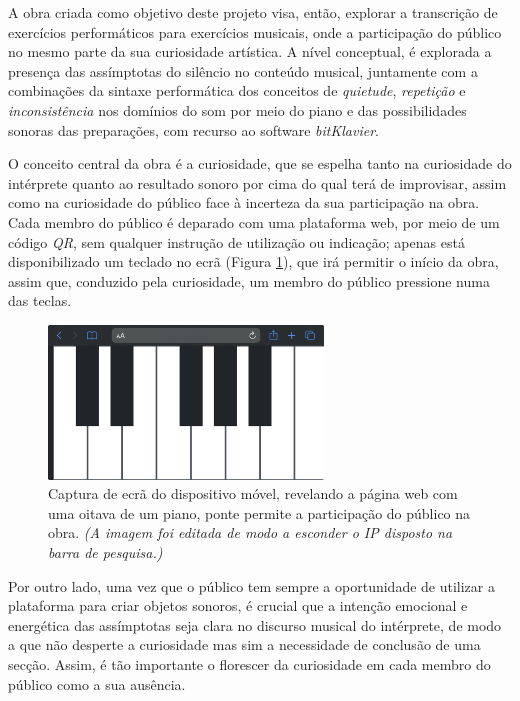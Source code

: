 \documentclass[../main.tex]{subfiles}
\begin{document}
A obra criada como objetivo deste projeto visa, então, explorar a transcrição de exercícios performáticos para exercícios musicais, onde a participação do público no mesmo parte da sua curiosidade artística. A nível conceptual, é explorada a presença das assímptotas do silêncio no conteúdo musical, juntamente com a combinações da sintaxe performática dos conceitos de \textsl{quietude}, \textsl{repetição} e \textsl{inconsistência} nos domínios do som por meio do piano e das possibilidades sonoras das preparações, com recurso ao software \textsl{bitKlavier}.

O conceito central da obra é a curiosidade, que se espelha tanto na curiosidade do intérprete quanto ao resultado sonoro por cima do qual terá de improvisar, assim como na curiosidade do público face à incerteza da sua participação na obra. Cada membro do público é deparado com uma plataforma web, por meio de um código \textsl{QR}, sem qualquer instrução de utilização ou indicação; apenas está disponibilizado um teclado no ecrã (Figura \ref{fig:Piano}), que irá permitir o início da obra, assim que, conduzido pela curiosidade, um membro do público pressione numa das teclas.

\begin{figure}[h]
    \centering
    \captionsetup{width=0.75\textwidth}
    \includegraphics[width=0.65\textwidth]{images/Piano.jpeg}
    \caption{Captura de ecrã do dispositivo móvel, revelando a página web com uma oitava de um piano, ponte permite a participação do público na obra. \textsl{(A imagem foi editada de modo a esconder o IP disposto na barra de pesquisa.)}}
    \label{fig:Piano}
\end{figure}

Por outro lado, uma vez que o público tem sempre a oportunidade de utilizar a plataforma para criar objetos sonoros, é crucial que a intenção emocional e energética das assímptotas seja clara no discurso musical do intérprete, de modo a que não desperte a curiosidade mas sim a necessidade de conclusão de uma secção. Assim, é tão importante o florescer da curiosidade em cada membro do público como a sua ausência. 
\end{document}
